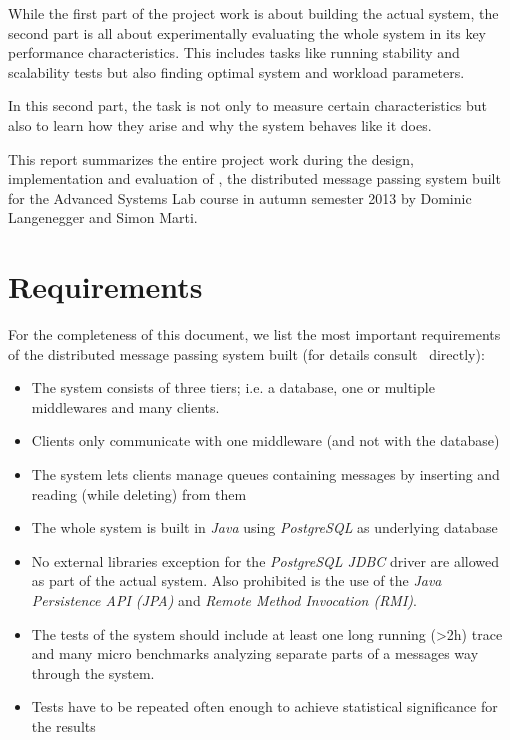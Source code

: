 \documentclass[a4paper, oneside]{csthesis}
\begin{document}
	While the first part of the project work is about building the actual
	system, the second part is all about experimentally evaluating the whole system
	in its key performance characteristics. This includes tasks like running
	stability and scalability tests but also finding optimal system and workload
	parameters.
	
    In this second part, the task is not only to measure certain characteristics but
    also to learn how they arise and why the system behaves like it does.
	
	This report summarizes the entire project work during the design,
	implementation and evaluation of \telesto, the distributed message passing
	system built for the Advanced Systems Lab course in autumn semester 2013 by
	Dominic Langenegger and Simon Marti.
	
	
\section{Requirements}
    For the completeness of this document, we list the most important
    requirements of the distributed message passing system built (for details
    consult~\cite{asl:course-description} directly):
    
    \begin{itemize}
        \item The system consists of three tiers; i.e. a database, one or
        multiple middlewares and many clients.
        \item Clients only communicate with one middleware (and not with the
        database)
        \item The system lets clients manage queues containing messages by
        inserting and reading (while deleting) from them
        \item The whole system is built in {\it Java} using {\it PostgreSQL} as
        underlying database
        \item No external libraries exception for the {\it PostgreSQL JDBC}
        driver are allowed as part of the actual system. Also prohibited is the
        use of the {\it Java Persistence API (JPA)} and {\it Remote Method
        Invocation (RMI)}.
        \item The tests of the system should include at least one long running
        (\textgreater 2h) trace and many micro benchmarks analyzing separate
        parts of a messages way through the system. 
        \item Tests have to be repeated often enough to achieve statistical
        significance for the results
    \end{itemize}
\end{document}
